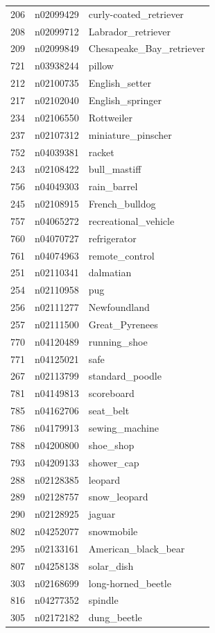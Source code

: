 \begin{table}
\begin{tabular}{cll}
206 & n02099429 & curly-coated_retriever \\
208 & n02099712 & Labrador_retriever \\
209 & n02099849 & Chesapeake_Bay_retriever \\
721 & n03938244 & pillow \\
212 & n02100735 & English_setter \\
217 & n02102040 & English_springer \\
234 & n02106550 & Rottweiler \\
237 & n02107312 & miniature_pinscher \\
752 & n04039381 & racket \\
243 & n02108422 & bull_mastiff \\
756 & n04049303 & rain_barrel \\
245 & n02108915 & French_bulldog \\
757 & n04065272 & recreational_vehicle \\
760 & n04070727 & refrigerator \\
761 & n04074963 & remote_control \\
251 & n02110341 & dalmatian \\
254 & n02110958 & pug \\
256 & n02111277 & Newfoundland \\
257 & n02111500 & Great_Pyrenees \\
770 & n04120489 & running_shoe \\
771 & n04125021 & safe \\
267 & n02113799 & standard_poodle \\
781 & n04149813 & scoreboard \\
785 & n04162706 & seat_belt \\
786 & n04179913 & sewing_machine \\
788 & n04200800 & shoe_shop \\
793 & n04209133 & shower_cap \\
288 & n02128385 & leopard \\
289 & n02128757 & snow_leopard \\
290 & n02128925 & jaguar \\
802 & n04252077 & snowmobile \\
295 & n02133161 & American_black_bear \\
807 & n04258138 & solar_dish \\
303 & n02168699 & long-horned_beetle \\
816 & n04277352 & spindle \\
305 & n02172182 & dung_beetle \\

\end{tabular}
\end{table}

